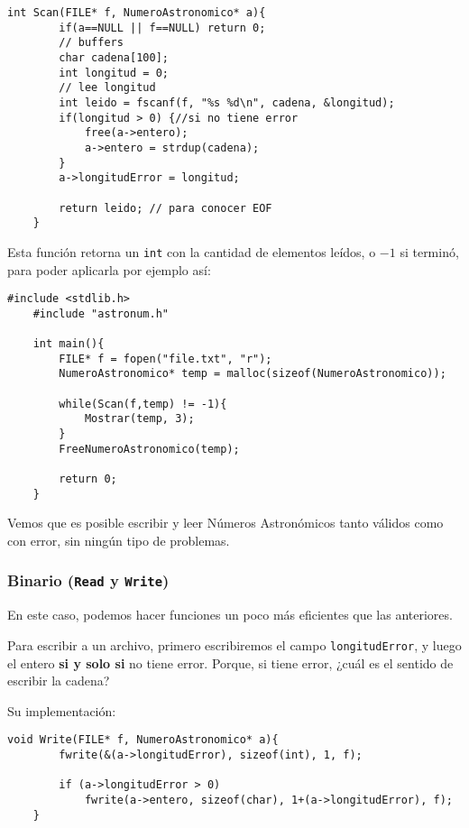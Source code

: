 \documentclass[a4paper, 12pt]{article}
\begin{document}
\begin{lstlisting}[style=C]
    int Scan(FILE* f, NumeroAstronomico* a){
        if(a==NULL || f==NULL) return 0;
        // buffers
        char cadena[100];
        int longitud = 0;
        // lee longitud
        int leido = fscanf(f, "%s %d\n", cadena, &longitud);
        if(longitud > 0) {//si no tiene error
            free(a->entero);
            a->entero = strdup(cadena);
        }
        a->longitudError = longitud;
    
        return leido; // para conocer EOF
    }
\end{lstlisting}

Esta función retorna un \verb|int| con la cantidad de elementos leídos, o $-1$ si terminó, para poder aplicarla por ejemplo así:

\begin{lstlisting}[style=C]
    #include <stdlib.h>
    #include "astronum.h"
    
    int main(){
        FILE* f = fopen("file.txt", "r");
        NumeroAstronomico* temp = malloc(sizeof(NumeroAstronomico));
        
        while(Scan(f,temp) != -1){
            Mostrar(temp, 3);
        }
        FreeNumeroAstronomico(temp);
        
        return 0;
    }
\end{lstlisting}

Vemos que es posible escribir y leer Números Astronómicos tanto válidos como con error, sin ningún tipo de problemas.

\subsubsection{Binario (\texttt{Read} y \texttt{Write})} \label{persistencia-binario}

En este caso, podemos hacer funciones un poco más eficientes que las anteriores.

Para escribir a un archivo, primero escribiremos el campo \texttt{longitudError}, y luego el entero \textbf{si y solo si} no tiene error. Porque, si tiene error, ¿cuál es el sentido de escribir la cadena?

Su implementación:

\begin{lstlisting}[style=C]
    void Write(FILE* f, NumeroAstronomico* a){
        fwrite(&(a->longitudError), sizeof(int), 1, f);
        
        if (a->longitudError > 0)
            fwrite(a->entero, sizeof(char), 1+(a->longitudError), f);
    }
\end{lstlisting}
\end{document}

